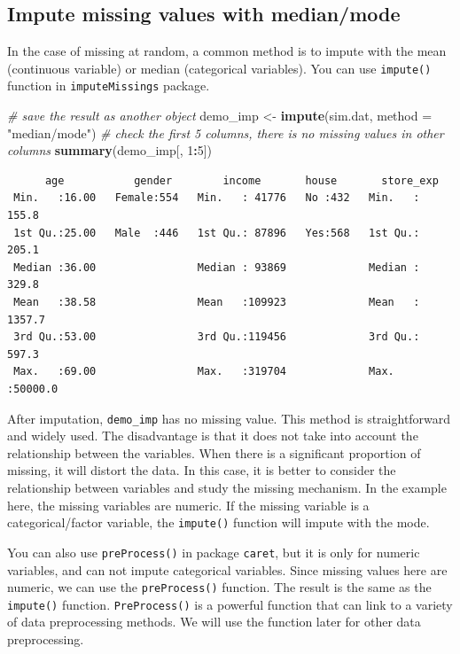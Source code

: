 \documentclass[12pt,]{krantz}
\makeatletter
\newenvironment{Shaded}{\begin{snugshade}}{\end{snugshade}}
\newcommand{\CommentTok}[1]{\textcolor[rgb]{0.37,0.37,0.37}{\textit{#1}}}
\newcommand{\DataTypeTok}[1]{\textcolor[rgb]{0.27,0.27,0.27}{#1}}
\newcommand{\DecValTok}[1]{\textcolor[rgb]{0.06,0.06,0.06}{#1}}
\newcommand{\KeywordTok}[1]{\textcolor[rgb]{0.27,0.27,0.27}{\textbf{#1}}}
\newcommand{\NormalTok}[1]{#1}
\newcommand{\OperatorTok}[1]{\textcolor[rgb]{0.43,0.43,0.43}{\textbf{#1}}}
\newcommand{\StringTok}[1]{\textcolor[rgb]{0.5,0.5,0.5}{#1}}
\newenvironment{kframe}{%
\medskip{}
\setlength{\fboxsep}{.8em}
 \def\at@end@of@kframe{}%
 \ifinner\ifhmode%
  \def\at@end@of@kframe{\end{minipage}}%
  \begin{minipage}{\columnwidth}%
 \fi\fi%
 \def\FrameCommand##1{\hskip\@totalleftmargin \hskip-\fboxsep
 \colorbox{shadecolor}{##1}\hskip-\fboxsep
     \hskip-\linewidth \hskip-\@totalleftmargin \hskip\columnwidth}%
 \MakeFramed {\advance\hsize-\width
   \@totalleftmargin\z@ \linewidth\hsize
   \@setminipage}}%
 {\par\unskip\endMakeFramed%
 \at@end@of@kframe}
\renewenvironment{Shaded}{\begin{kframe}}{\end{kframe}}
\makeatother
\begin{document}
\hypertarget{impute-missing-values-with-medianmode}{%
\subsection{Impute missing values with median/mode}\label{impute-missing-values-with-medianmode}}

In the case of missing at random, a common method is to impute with the mean (continuous variable) or median (categorical variables). You can use \texttt{impute()} function in \texttt{imputeMissings} package.

\begin{Shaded}
\begin{Highlighting}[]
\CommentTok{# save the result as another object}
\NormalTok{demo_imp <-}\StringTok{ }\KeywordTok{impute}\NormalTok{(sim.dat, }\DataTypeTok{method =} \StringTok{"median/mode"}\NormalTok{)}
\CommentTok{# check the first 5 columns, there is no missing values in other columns}
\KeywordTok{summary}\NormalTok{(demo_imp[, }\DecValTok{1}\OperatorTok{:}\DecValTok{5}\NormalTok{])}
\end{Highlighting}
\end{Shaded}

\begin{verbatim}
      age           gender        income       house       store_exp      
 Min.   :16.00   Female:554   Min.   : 41776   No :432   Min.   :  155.8  
 1st Qu.:25.00   Male  :446   1st Qu.: 87896   Yes:568   1st Qu.:  205.1  
 Median :36.00                Median : 93869             Median :  329.8  
 Mean   :38.58                Mean   :109923             Mean   : 1357.7  
 3rd Qu.:53.00                3rd Qu.:119456             3rd Qu.:  597.3  
 Max.   :69.00                Max.   :319704             Max.   :50000.0
\end{verbatim}

After imputation, \texttt{demo\_imp} has no missing value. This method is straightforward and widely used. The disadvantage is that it does not take into account the relationship between the variables. When there is a significant proportion of missing, it will distort the data. In this case, it is better to consider the relationship between variables and study the missing mechanism. In the example here, the missing variables are numeric. If the missing variable is a categorical/factor variable, the \texttt{impute()} function will impute with the mode.

You can also use \texttt{preProcess()} in package \texttt{caret}, but it is only for numeric variables, and can not impute categorical variables. Since missing values here are numeric, we can use the \texttt{preProcess()} function. The result is the same as the \texttt{impute()} function. \texttt{PreProcess()} is a powerful function that can link to a variety of data preprocessing methods. We will use the function later for other data preprocessing.
\end{document}
